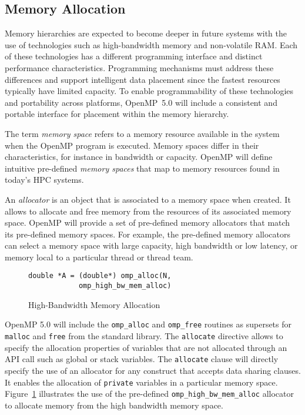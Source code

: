 \subsection{Memory Allocation}
\label{sub:allocators_and_hierarchical_memory}

Memory hierarchies are expected to become deeper in future systems with the
use of technologies such as high-bandwidth memory and non-volatile RAM. Each 
of these technologies has a different programming interface and distinct
performance characteristics. Programming mechanisms must address these 
differences and support intelligent data placement since the fastest resources
typically have limited capacity. To enable programmability of these 
technologies and portability across platforms, OpenMP~5.0 will include a 
consistent and portable interface for placement within the memory hierarchy.

The term \emph{memory space} refers to a memory resource available in the
system when the OpenMP program is executed. Memory spaces differ in their characteristics, for instance in bandwidth or
capacity. OpenMP will define intuitive pre-defined \emph{memory spaces} that map to memory resources found in today's HPC systems.

An \emph{allocator} is an object that is associated to a memory space when created. It allows to allocate and free memory from the resources of its associated memory space. OpenMP will provide a set of pre-defined memory allocators that match its pre-defined memory spaces. For example, the pre-defined memory allocators can select a memory space with large capacity, high bandwidth or low latency, 
or memory local to a particular thread or thread team.


\begin{figure}
\begin{verbatim}
double *A = (double*) omp_alloc(N,
            omp_high_bw_mem_alloc)
\end{verbatim}
\caption{High-Bandwidth Memory Allocation\label{fig:allocators}}
\end{figure}

OpenMP 5.0 will include the \texttt{omp\_alloc} and \texttt{omp\_free} 
routines as supersets for \texttt{malloc} and \texttt{free} from 
the standard library. The \texttt{allocate} directive allows to specify the allocation properties of variables that are not allocated through an API call such as global or stack variables. The \texttt{allocate} clause will directly specify 
the use of an allocator for any construct that accepts data sharing clauses.
It enables the allocation of \texttt{private} variables in a particular memory
space. Figure~\ref{fig:allocators} illustrates the use of the pre-defined
\texttt{omp\_high\_bw\_mem\_alloc} allocator to allocate memory from the 
high bandwidth memory space.

